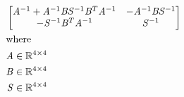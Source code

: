 \documentclass[12pt]{article}
\begin{document}
\begin{center}
\resizebox{\textwidth}{!} 
{
\begin{minipage}[c]{\textwidth}
\begin{align*}
 \omit \span \begin{bmatrix}
\mathit{A}^{-1} + \mathit{A}^{-1}\mathit{B}\mathit{S}^{-1}{\mathit{B}}^T\mathit{A}^{-1} & -\mathit{A}^{-1}\mathit{B}\mathit{S}^{-1}\\
-\mathit{S}^{-1}{\mathit{B}}^T\mathit{A}^{-1} & \mathit{S}^{-1}\\
\end{bmatrix} \\
\intertext{where} 
\mathit{A} & \in \mathbb{R}^{ 4 \times 4 } \\
\mathit{B} & \in \mathbb{R}^{ 4 \times 4 } \\
\mathit{S} & \in \mathbb{R}^{ 4 \times 4 } \\
\\
\end{align*}
\end{minipage}
}
\end{center}
\end{document}
